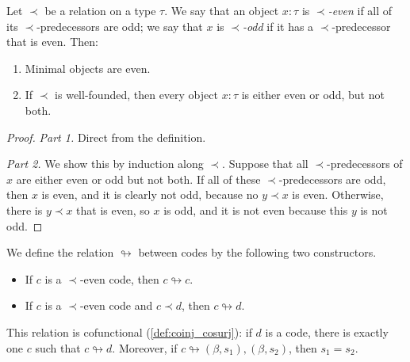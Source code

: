 \begin{proposition}
  \label{prop:odd_iff_not_even}
  Let \( \prec \) be a relation on a type \( \tau \).
  We say that an object \( x : \tau \) is \emph{\( \prec \)-even} if all of its \( \prec \)-predecessors are odd; we say that \( x \) is \emph{\( \prec \)-odd} if it has a \( \prec \)-predecessor that is even.
  Then:
  \begin{enumerate}
    \item Minimal objects are even.
    \item If \( \prec \) is well-founded, then every object \( x : \tau \) is either even or odd, but not both.
  \end{enumerate}
\end{proposition}
\begin{proof}
  \emph{Part 1.}
  Direct from the definition.

  \emph{Part 2.}
  We show this by induction along \( \prec \).
  Suppose that all \( \prec \)-predecessors of \( x \) are either even or odd but not both.
  If all of these \( \prec \)-predecessors are odd, then \( x \) is even, and it is clearly not odd, because no \( y \prec x \) is even.
  Otherwise, there is \( y \prec x \) that is even, so \( x \) is odd, and it is not even because this \( y \) is not odd.
\end{proof}
\begin{definition}
  \label{def:Code.Represents}
  We define the relation \( \looparrowright \) between codes by the following two constructors.
  \begin{itemize}
    \item If \( c \) is a \( \prec \)-even code, then \( c \looparrowright c \).
    \item If \( c \) is a \( \prec \)-even code and \( c \prec d \), then \( c \looparrowright d \).
  \end{itemize}
  This relation is cofunctional (\cref{def:coinj_cosurj}): if \( d \) is a code, there is exactly one \( c \) such that \( c \looparrowright d \).
  Moreover, if \( c \looparrowright (\beta, s_1), (\beta, s_2) \), then \( s_1 = s_2 \).
\end{definition}
